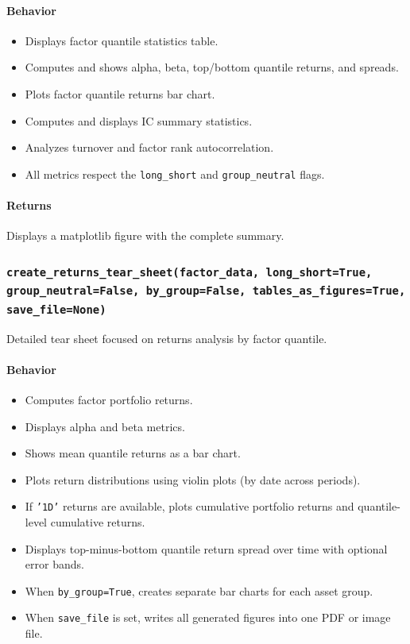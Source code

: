 \documentclass[11pt]{article}
\begin{document}
\paragraph{Behavior}
\begin{itemize}
  \item Displays factor quantile statistics table.
  \item Computes and shows alpha, beta, top/bottom quantile returns, and spreads.
  \item Plots factor quantile returns bar chart.
  \item Computes and displays IC summary statistics.
  \item Analyzes turnover and factor rank autocorrelation.
  \item All metrics respect the \texttt{long\_short} and \texttt{group\_neutral} flags.
\end{itemize}

\paragraph{Returns}
Displays a matplotlib figure with the complete summary.

\subsubsection{\texttt{create\_returns\_tear\_sheet(factor\_data, long\_short=True, group\_neutral=False, by\_group=False, tables\_as\_figures=True, save\_file=None)}}
Detailed tear sheet focused on returns analysis by factor quantile.

\paragraph{Behavior}
\begin{itemize}
  \item Computes factor portfolio returns.
  \item Displays alpha and beta metrics.
  \item Shows mean quantile returns as a bar chart.
  \item Plots return distributions using violin plots (by date across periods).
  \item If \texttt{'1D'} returns are available, plots cumulative portfolio returns and quantile-level cumulative returns.
  \item Displays top-minus-bottom quantile return spread over time with optional error bands.
  \item When \texttt{by\_group=True}, creates separate bar charts for each asset group.
  \item When \texttt{save\_file} is set, writes all generated figures into one PDF or image file.
\end{itemize}
\end{document}
